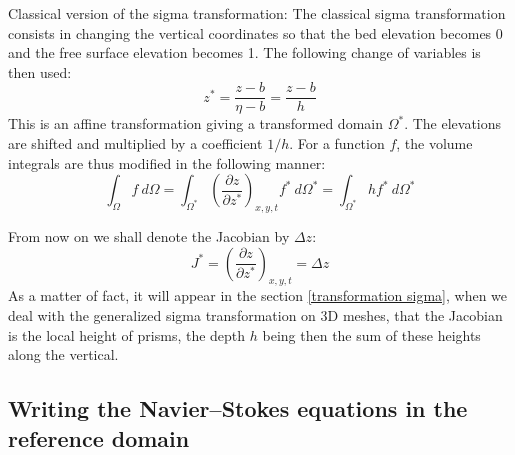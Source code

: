 \begin{CommentBlock}{Classical version of the sigma transformation:}
The classical sigma transformation consists in changing the vertical
coordinates so that the bed elevation becomes 0 and the free surface
elevation becomes 1. The following change of variables is then used:%
\begin{equation}
z^{\ast}=\dfrac{z-b}{\eta-b}=\dfrac{z-b}{h}%
\end{equation}
This is an affine transformation giving a transformed domain $\Omega^{*} $.
The elevations are shifted and multiplied by a coefficient $1/h$. For a
function $f$, the volume integrals are thus modified in the following manner:%
\begin{equation}
\int_{\Omega} f~d\Omega = \int_{\Omega^{\ast}}\left(\dfrac{\partial z}{\partial z^{\ast}}\right)_{x,y,t}
f^{\ast}~d\Omega^{\ast}=\int_{\Omega^{\ast}}h f^\ast ~d\Omega^{\ast}
\end{equation}
\end{CommentBlock}

From now on we shall denote the Jacobian by $\Delta z$:
\begin{equation}
J^*=\left(\dfrac{\partial z}{\partial z^{\ast}}\right)_{x,y,t}=\Delta z
\end{equation}
As a matter of fact, it will appear in the section \ref{transformation sigma}, when we deal
with the generalized sigma transformation on 3D meshes, that the Jacobian is the
local height of prisms, the depth $h$ being then the sum of these heights along the vertical.

\subsection{Writing the Navier--Stokes equations in the reference domain}
